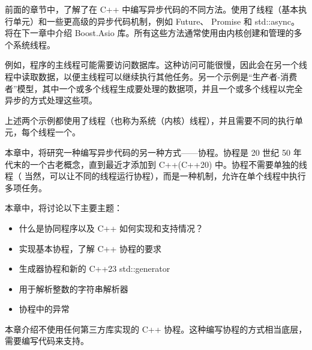 前面的章节中，了解了在 C++ 中编写异步代码的不同方法。使用了线程（基本执行单元）和一些更高级的异步代码机制，例如 Future、 Promise 和 std::async。将在下一章中介绍 Boost.Asio 库。所有这些方法通常使用由内核创建和管理的多个系统线程。

例如，程序的主线程可能需要访问数据库。这种访问可能很慢，因此会在另一个线程中读取数据，以便主线程可以继续执行其他任务。另一个示例是“生产者-消费者”模型，其中一个或多个线程生成要处理的数据项，并且一个或多个线程以完全异步的方式处理这些项。

上述两个示例都使用了线程（也称为系统（内核）线程），并且需要不同的执行单元，每个线程一个。

本章中，将研究一种编写异步代码的另一种方式——协程。协程是 20 世纪 50 年代末的一个古老概念，直到最近才添加到 C++(C++20) 中。协程不需要单独的线程（ 当然，可以让不同的线程运行协程），而是一种机制，允许在单个线程中执行多项任务。

本章中，将讨论以下主要主题：

\begin{itemize}
\item
什么是协同程序以及 C++ 如何实现和支持情况？

\item
实现基本协程，了解 C++ 协程的要求

\item
生成器协程和新的 C++23 std::generator

\item
用于解析整数的字符串解析器

\item
协程中的异常
\end{itemize}

本章介绍不使用任何第三方库实现的 C++ 协程。这种编写协程的方式相当底层，需要编写代码来支持。

